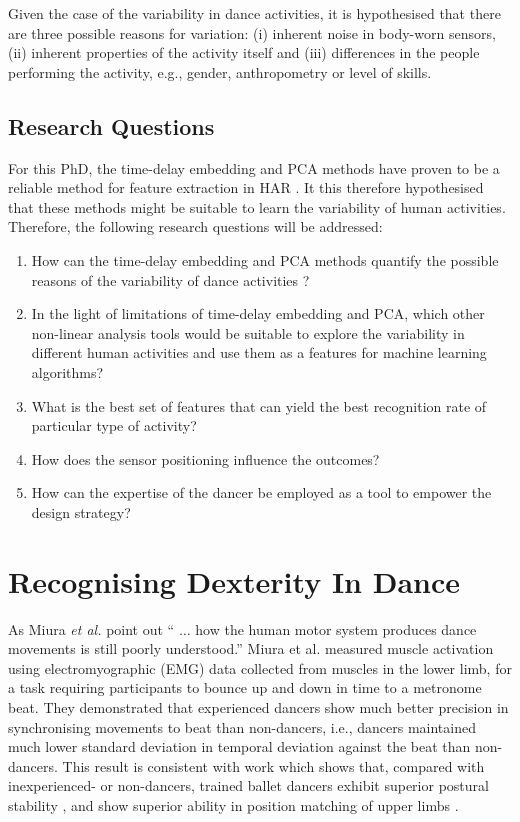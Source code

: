\documentclass[10pt,journal,compsoc]{IEEEtran}
\begin{document}
Given the case of the variability in dance activities, it is hypothesised that 
there are three possible reasons for variation:
(i) inherent noise in body-worn sensors, 
(ii) inherent properties of the activity itself and
(iii) differences in the people performing the activity, e.g., gender, 
anthropometry or level of skills.

\subsection{Research Questions}
For this PhD, the time-delay embedding and PCA methods
have proven to be a reliable method for feature extraction in HAR
\cite{Gouwanda2012, Sama2013, Frank2010}. It this therefore hypothesised that 
these methods might be suitable to learn the variability of human
activities. Therefore, the following research questions will be addressed:
\begin{enumerate}
\item How can the time-delay embedding and PCA methods quantify 
 the possible reasons of the variability of dance activities ?
\item In the light of limitations of time-delay embedding and PCA,
 which other non-linear analysis tools would be suitable to explore 
 the variability in different human activities and use them as a 
features for machine learning algorithms?
\item What is the best set of features that can yield the best recognition
rate of particular type of activity?
\item How does the sensor positioning influence the outcomes?
\item How can the expertise of the dancer be employed as a tool to empower
the design strategy?
\end{enumerate}




\section{Recognising Dexterity In Dance }
As Miura \textit{et al.} \cite{Miura2015} point out 
`` $\ldots$ how the human motor 
system produces dance movements is still poorly understood.''
Miura et al. \cite{Miura2013} measured muscle activation using 
electromyographic (EMG) data collected from muscles in 
the lower limb, for a task requiring participants to 
bounce up and down in time to a metronome beat. They 
demonstrated that experienced dancers show much better 
precision in synchronising  movements to beat than non-dancers, 
i.e., dancers maintained much lower standard deviation in 
temporal deviation against the beat than non-dancers. 
This result is consistent with work which shows that, compared with inexperienced- or 
non-dancers, trained ballet dancers exhibit superior postural 
stability \cite{Crotts1996}, and show superior ability in position matching 
of upper limbs \cite{Ramsay2001}.
\end{document}
